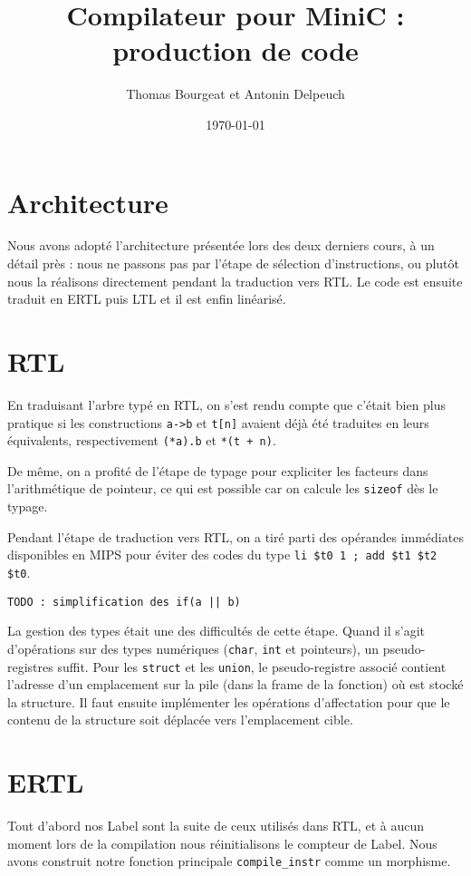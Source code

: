 \documentclass[a4paper]{article}
\begin{document}
\title{Compilateur pour MiniC : production de code}
\author{Thomas Bourgeat et Antonin Delpeuch}
\date{\today}

\maketitle

\section{Architecture}

Nous avons adopté l'architecture présentée lors des deux derniers cours, à un détail près :
nous ne passons pas par l'étape de sélection d'instructions, ou plutôt nous la réalisons
directement pendant la traduction vers RTL. Le code est ensuite traduit en ERTL puis LTL et
il est enfin linéarisé.

\section{RTL}

En traduisant l'arbre typé en RTL, on s'est rendu compte que c'était bien plus pratique si
les constructions \texttt{a->b} et \texttt{t[n]} avaient déjà été traduites en leurs équivalents,
respectivement \texttt{(*a).b} et \texttt{*(t + n)}.

De même, on a profité de l'étape de typage pour expliciter les facteurs dans l'arithmétique de pointeur,
ce qui est possible car on calcule les \texttt{sizeof} dès le typage.

Pendant l'étape de traduction vers RTL, on a tiré parti des opérandes immédiates disponibles en MIPS
pour éviter des codes du type \texttt{li  \$t0 1 ; add \$t1 \$t2 \$t0}.

\texttt{TODO : simplification des if(a || b)}

La gestion des types était une des difficultés de cette étape. Quand il s'agit d'opérations sur des types
numériques (\texttt{char}, \texttt{int} et pointeurs), un pseudo-registres suffit. Pour les \texttt{struct}
et les \texttt{union}, le pseudo-registre associé contient l'adresse d'un emplacement sur la pile (dans la
frame de la fonction) où est stocké la structure. Il faut ensuite implémenter les opérations
d'affectation pour que le contenu de la structure soit déplacée vers l'emplacement cible.

\section{ERTL}
Tout d'abord nos Label sont la suite de ceux utilisés dans RTL, et à
aucun moment lors de la compilation nous réinitialisons le compteur de
Label. Nous avons construit notre fonction principale
\texttt{compile\_instr} comme un morphisme.
\end{document}
